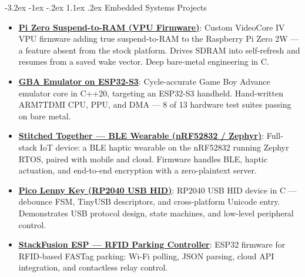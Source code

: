\documentclass[letterpaper,11pt]{article}
\makeatletter
\renewcommand\section{\@startsection{section}{1}{\z@}%
  {-3.2ex \@plus -1ex \@minus -.2ex}%
  {1.1ex \@plus .2ex}%
  {\normalfont\large\bfseries}}
\newcommand{\resumeItem}[2]{\item\small{\textbf{#1}{: #2 \vspace{-2pt}}}}
\newcommand{\resumeSubItem}[2]{\resumeItem{#1}{#2}\vspace{-4pt}}
\newcommand{\resumeSubHeadingListStart}{\begin{itemize}}
\newcommand{\resumeSubHeadingListEnd}{\end{itemize}}
\makeatother
\begin{document}
\section{Embedded Systems Projects}
\resumeSubHeadingListStart
\resumeSubItem{\href{https://github.com/bhoot1234567890/vc4-suspend}{Pi Zero Suspend-to-RAM (VPU Firmware)}}
{Custom VideoCore IV VPU firmware adding true suspend-to-RAM to the Raspberry Pi Zero 2W --- a feature absent from the stock platform. Drives SDRAM into self-refresh and resumes from a saved wake vector. Deep bare-metal engineering in C.}
\resumeSubItem{\href{https://github.com/bhoot1234567890/gba-embedded}{GBA Emulator on ESP32-S3}}
{Cycle-accurate Game Boy Advance emulator core in C++20, targeting an ESP32-S3 handheld. Hand-written ARM7TDMI CPU, PPU, and DMA --- 8 of 13 hardware test suites passing on bare metal.}
\resumeSubItem{\href{https://github.com/bhoot1234567890/rinna-pcb}{Stitched Together --- BLE Wearable (nRF52832 / Zephyr)}}
{Full-stack IoT device: a BLE haptic wearable on the nRF52832 running Zephyr RTOS, paired with mobile and cloud. Firmware handles BLE, haptic actuation, and end-to-end encryption with a zero-plaintext server.}
\resumeSubItem{\href{https://github.com/bhoot1234567890/pico-lenny-key}{Pico Lenny Key (RP2040 USB HID)}}
{RP2040 USB HID device in C --- debounce FSM, TinyUSB descriptors, and cross-platform Unicode entry. Demonstrates USB protocol design, state machines, and low-level peripheral control.}
\resumeSubItem{\href{https://github.com/bhoot1234567890/StackFusion-ESP--}{StackFusion ESP --- RFID Parking Controller}}
{ESP32 firmware for RFID-based FASTag parking: Wi-Fi polling, JSON parsing, cloud API integration, and contactless relay control.}
\resumeSubHeadingListEnd
\end{document}
